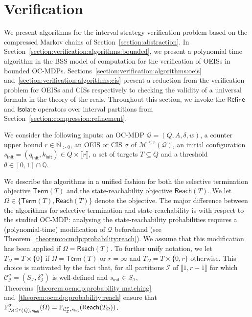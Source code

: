 \documentclass[a4paper,UKenglish,cleveref,autoref,thm-restate,colorlinks]{lipics-v2021}
\newcommand{\init}{\mathsf{init}}
\newcommand{\integerInterval}[1]{\llbracket{}#1\rrbracket{}}
\newcommand{\ccInt}[2]{\left[#1, #2\right]}
\newcommand{\IN}{\mathbb{N}}
\newcommand{\IQ}{\mathbb{Q}}
\newcommand{\INposBar}{\bar{\IN}_{>0}}
\newcommand{\mdp}{\mathcal{M}}
\newcommand{\mdpStateSpace}{S}
\newcommand{\mdpTrans}{\delta}
\newcommand{\weight}{w}
\newcommand{\ocmdp}{\mathcal{Q}}
\newcommand{\ocmdpFin}[2]{\mdp^{\leq #2}(#1)}
\newcommand{\ocStateSpace}{Q}
\newcommand{\ocState}{q}
\newcommand{\ocCount}{k}
\newcommand{\ocConfig}{s}
\newcommand{\ocActionSpace}{A}
\newcommand{\ocTrans}{\delta}
\newcommand{\ocTuple}{(\ocStateSpace, \ocActionSpace, \ocTrans, \weight)}
\newcommand{\counterUB}{r}
\newcommand{\mchain}{\mathcal{C}}
\newcommand{\intPart}{\mathcal{I}}
\newcommand{\compressChainStrat}[1]{\mchain^{#1}_{\intPart}}
\newcommand{\compressChain}{\compressChainStrat{\strat}}
\newcommand{\compressChainStateSpace}{\mdpStateSpace_{\intPart}}
\newcommand{\compressChainTransTemplate}[2]{\mdpTrans^{#1}_{#2}}
\newcommand{\compressChainTrans}{\compressChainTransTemplate{\strat}{\intPart}}
\newcommand{\objective}{\Omega}
\newcommand{\reach}[1]{\mathsf{Reach}(#1)}
\newcommand{\target}{T}
\newcommand{\termination}{\mathsf{Term}}
\newcommand{\selectiveTermination}[1]{\termination({#1})}
\newcommand{\thresProba}{\theta}
\newcommand{\stratGeneric}[1]{{\sigma_{#1}}}
\newcommand{\strat}{\stratGeneric{}}
\begin{document}
 
\section{Verification}\label{section:verification}

We present algorithms for the interval strategy verification problem based on the compressed Markov chains of Section~\ref{section:abstraction}.
In Section~\ref{section:verification:algorithms:bounded}, we present a polynomial time algorithm in the BSS model of computation for the verification of OEISs in bounded OC-MDPs.
Sections~\ref{section:verification:algorithms:oeis} and~\ref{section:verification:algorithms:cis} present a reduction from the verification problem for OEISs and CISs respectively to checking the validity of a universal formula in the theory of the reals.
Throughout this section, we invoke the $\mathsf{Refine}$ and $\mathsf{Isolate}$ operators over interval partitions from Section~\ref{section:compression:refinement}.

We consider the following inputs: an OC-MDP $\ocmdp=\ocTuple$, a counter upper bound $\counterUB\in\INposBar$, an OEIS or CIS $\strat$ of $\ocmdpFin{\ocmdp}{\counterUB}$, an initial configuration $\ocConfig_\init=(\ocState_\init, \ocCount_\init)\in\ocStateSpace\times\integerInterval{\counterUB}$, a set of targets $\target\subseteq\ocStateSpace$ and a threshold $\thresProba\in\ccInt{0}{1}\cap\IQ$.

We describe the algorithms in a unified fashion for both the selective termination objective $\selectiveTermination{\target}$ and the state-reachability objective $\reach{\target}$.
We let $\objective\in\{\selectiveTermination{\target}, \reach{\target}\}$ denote the objective.
The major difference between the algorithms for selective termination and state-reachability is with respect to the studied OC-MDP: analysing the state-reachability probabilities requires a (polynomial-time) modification of $\ocmdp$ beforehand (see Theorem~\ref{theorem:ocmdp:probability:reach}).
We assume that this modification has been applied if $\objective=\reach{\target}$.
To further unify notation, we let $\target_\objective = \target\times\{0\}$ if $\objective=\selectiveTermination{\target}$ or $\counterUB=\infty$ and $\target_\objective=\target\times\{0, \counterUB\}$ otherwise.
This choice is motivated by the fact that, for all partitions $\intPart$ of $\integerInterval{1, \counterUB-1}$ for which $\compressChain=(\compressChainStateSpace, \compressChainTrans)$ is well-defined and $\ocConfig_\init\in\compressChainStateSpace$, Theorems~\ref{theorem:ocmdp:probability matching} and~\ref{theorem:ocmdp:probability:reach} ensure that $\probaGverb{\ocmdpFin{\ocmdp}{\counterUB}}{\ocConfig_\init}{\strat}(\objective)=\probaMCverb{\compressChain}{\ocConfig_\init}(\reach{\target_\objective})$.
\end{document}
